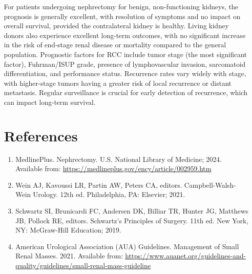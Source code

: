 For patients undergoing nephrectomy for benign, non-functioning kidneys, the prognosis is generally excellent, with resolution of symptoms and no impact on overall survival, provided the contralateral kidney is healthy. Living kidney donors also experience excellent long-term outcomes, with no significant increase in the risk of end-stage renal disease or mortality compared to the general population. Prognostic factors for RCC include tumor stage (the most significant factor), Fuhrman/ISUP grade, presence of lymphovascular invasion, sarcomatoid differentiation, and performance status. Recurrence rates vary widely with stage, with higher-stage tumors having a greater risk of local recurrence or distant metastasis. Regular surveillance is crucial for early detection of recurrence, which can impact long-term survival.

\section*{References}
\begin{enumerate}
  \item MedlinePlus. Nephrectomy. U.S. National Library of Medicine; 2024. Available from: \url{https://medlineplus.gov/ency/article/002959.htm}
  \item Wein AJ, Kavoussi LR, Partin AW, Peters CA, editors. Campbell-Walsh-Wein Urology. 12th ed. Philadelphia, PA: Elsevier; 2021.
  \item Schwartz SI, Brunicardi FC, Andersen DK, Billiar TR, Hunter JG, Matthews JB, Pollock RE, editors. Schwartz's Principles of Surgery. 11th ed. New York, NY: McGraw-Hill Education; 2019.
  \item American Urological Association (AUA) Guidelines. Management of Small Renal Masses. 2021. Available from: \url{https://www.auanet.org/guidelines-and-quality/guidelines/small-renal-mass-guideline}
\end{enumerate}

\clearpage
